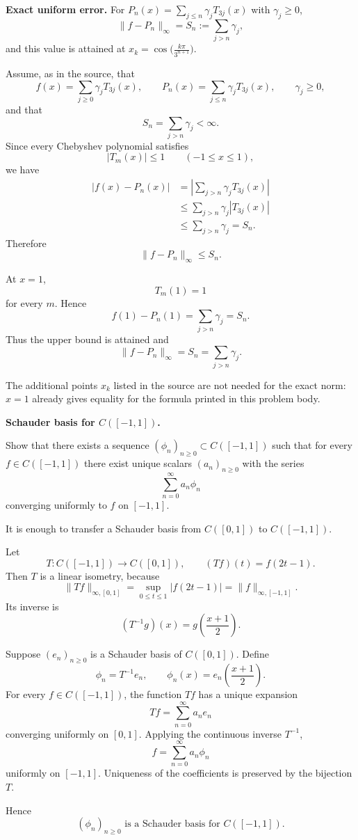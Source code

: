 \begin{problem}[CP-II-0089]
\label{prob:cp-ii-0089}
\textbf{Exact uniform error.}
	For $P_n(x)=\sum_{j\le n}\gamma_j T_{3j}(x)$ with $\gamma_j\ge 0$,
	\[
	\|f-P_n\|_\infty = S_n:=\sum_{j>n}\gamma_j,
	\]
	and this value is attained at $x_k=\cos\!\big(\tfrac{k\pi}{3^{n+1}}\big)$.
\end{problem}

\begin{solution}
Assume, as in the source, that
\[
f(x)=\sum_{j\ge0}\gamma_jT_{3j}(x),
\qquad
P_n(x)=\sum_{j\le n}\gamma_jT_{3j}(x),
\qquad
\gamma_j\ge0,
\]
and that
\[
S_n=\sum_{j>n}\gamma_j<\infty.
\]
Since every Chebyshev polynomial satisfies
\[
|T_m(x)|\le1
\qquad(-1\le x\le1),
\]
we have
\[
\begin{aligned}
|f(x)-P_n(x)|
&=
\left|
\sum_{j>n}\gamma_jT_{3j}(x)
\right|\\
&\le
\sum_{j>n}\gamma_j|T_{3j}(x)|\\
&\le
\sum_{j>n}\gamma_j
=
S_n.
\end{aligned}
\]
Therefore
\[
\|f-P_n\|_\infty\le S_n.
\]

At \(x=1\),
\[
T_m(1)=1
\]
for every \(m\). Hence
\[
f(1)-P_n(1)
=
\sum_{j>n}\gamma_j
=
S_n.
\]
Thus the upper bound is attained and
\[
\boxed{
\|f-P_n\|_\infty
=
S_n
=
\sum_{j>n}\gamma_j.
}
\]

The additional points \(x_k\) listed in the source are not needed for the exact norm:
\(x=1\) already gives equality for the formula printed in this problem body.
\end{solution}


\begin{problem}[CP-II-0091]
\label{prob:cp-ii-0091}
\textbf{Schauder basis for $C([-1,1])$.}

\hspace*{1.5em}Show that there exists a sequence $(\phi_n)_{n\ge 0}\subset C([-1,1])$ such that for every
	$f\in C([-1,1])$ there exist unique scalars $(a_n)_{n\ge 0}$ with the series
	\[
	\sum_{n=0}^\infty a_n \phi_n
	\]
	converging uniformly to $f$ on $[-1,1]$.
\end{problem}

\begin{solution}
It is enough to transfer a Schauder basis from \(C([0,1])\) to \(C([-1,1])\).

Let
\[
T:C([-1,1])\to C([0,1]),
\qquad
(Tf)(t)=f(2t-1).
\]
Then \(T\) is a linear isometry, because
\[
\|Tf\|_{\infty,[0,1]}
=
\sup_{0\le t\le1}|f(2t-1)|
=
\|f\|_{\infty,[-1,1]}.
\]
Its inverse is
\[
(T^{-1}g)(x)=g\!\left(\frac{x+1}{2}\right).
\]

Suppose \((e_n)_{n\ge0}\) is a Schauder basis of \(C([0,1])\). Define
\[
\phi_n=T^{-1}e_n,
\qquad
\phi_n(x)=e_n\!\left(\frac{x+1}{2}\right).
\]
For every \(f\in C([-1,1])\), the function \(Tf\) has a unique expansion
\[
Tf=\sum_{n=0}^{\infty}a_ne_n
\]
converging uniformly on \([0,1]\). Applying the continuous inverse \(T^{-1}\),
\[
f=\sum_{n=0}^{\infty}a_n\phi_n
\]
uniformly on \([-1,1]\). Uniqueness of the coefficients is preserved by the
bijection \(T\).

Hence
\[
\boxed{(\phi_n)_{n\ge0}\text{ is a Schauder basis for }C([-1,1]).}
\]
\end{solution}


